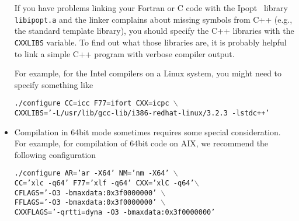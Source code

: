 \documentclass[10pt]{article}
\newcommand{\Ipopt}{{\sc Ipopt }}
\begin{document}
\begin{itemize}
  If you have problems linking your Fortran or C code with the \Ipopt\
  library {\tt libipopt.a} and the linker complains about missing
  symbols from C++ (e.g., the standard template library), you should
  specify the C++ libraries with the {\tt CXXLIBS} variable.  To find out
  what those libraries are, it is probably helpful to link a  simple C++
  program with verbose compiler output.

  For example, for the Intel compilers on a Linux system, you
  might need to specify something like

  {\tt ./configure CC=icc F77=ifort CXX=icpc $\backslash$\\ \hspace*{14ex} CXXLIBS='-L/usr/lib/gcc-lib/i386-redhat-linux/3.2.3 -lstdc++'}

\item Compilation in 64bit mode sometimes requires some special
  consideration.  For example, for compilation of 64bit code on AIX,
  we recommend the following configuration

  {\tt ./configure AR='ar -X64' NM='nm -X64' $\backslash$\\
    \hspace*{14ex} CC='xlc -q64' F77='xlf -q64' CXX='xlC
    -q64'$\backslash$\\ \hspace*{14ex} CFLAGS='-O3
    -bmaxdata:0x3f0000000'
    $\backslash$\\ \hspace*{14ex} FFLAGS='-O3 -bmaxdata:0x3f0000000' $\backslash$\\
    \hspace*{14ex} CXXFLAGS='-qrtti=dyna -O3 -bmaxdata:0x3f0000000'}




\end{itemize}
\end{document}
